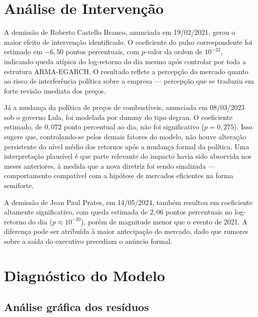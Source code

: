 \documentclass[12pt, a4paper]{article}
\begin{document}
\section{Análise de Intervenção}
\label{sec:interv}

A demissão de Roberto Castello Branco, anunciada em 19/02/2021, gerou o maior efeito de intervenção identificado. O coeficiente do pulso correspondente foi estimado em $-6{,}50$ pontos percentuais, com $p$-valor da ordem de $10^{-22}$, indicando queda atípica do log-retorno do dia mesmo após controlar por toda a estrutura ARMA-EGARCH. O resultado reflete a percepção do mercado quanto ao risco de interferência política sobre a empresa --- percepção que se traduziu em forte revisão imediata dos preços.

Já a mudança da política de preços de combustíveis, anunciada em 08/03/2023 sob o governo Lula, foi modelada por dummy do tipo degrau. O coeficiente estimado, de $0{,}072$ ponto percentual ao dia, não foi significativo ($p = 0{,}275$). Isso sugere que, controlando-se pelos demais fatores do modelo, não houve alteração persistente do nível médio dos retornos após a mudança formal da política. Uma interpretação plausível é que parte relevante do impacto havia sido absorvida nos meses anteriores, à medida que a nova diretriz foi sendo sinalizada --- comportamento compatível com a hipótese de mercados eficientes na forma semiforte.

A demissão de Jean Paul Prates, em 14/05/2024, também resultou em coeficiente altamente significativo, com queda estimada de $2{,}06$ pontos percentuais no log-retorno do dia ($p \approx 10^{-20}$), porém de magnitude menor que o evento de 2021. A diferença pode ser atribuída à maior antecipação do mercado, dado que rumores sobre a saída do executivo precediam o anúncio formal.

\section{Diagnóstico do Modelo}
\label{sec:diag}

\subsection{Análise gráfica dos resíduos}
\end{document}
